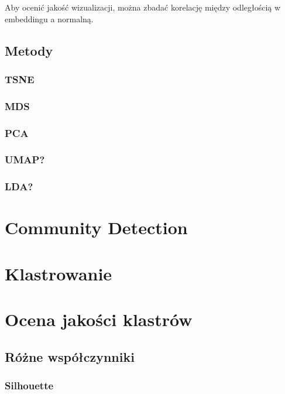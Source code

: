 \documentclass{article}
\begin{document}
Aby ocenić jakość wizualizacji, można zbadać korelację między odległością w
embeddingu a normalną.

\subsection{Metody}

\subsubsection{TSNE}

\subsubsection{MDS}

\subsubsection{PCA}

\subsubsection{UMAP?}

\subsubsection{LDA?}

\section{Community Detection}

\section{Klastrowanie}

\section{Ocena jakości klastrów}

\subsection{Różne współczynniki}

\subsubsection{Silhouette}
\end{document}
